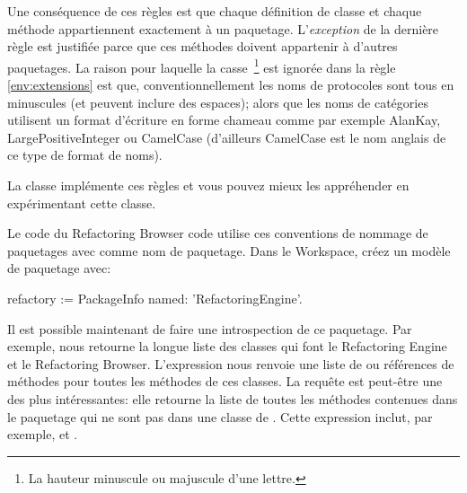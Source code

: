 \documentclass[a4paper,10pt,twoside]{book}
\begin{document}
\noindent
Une cons\'equence de ces r\`egles est que chaque d\'efinition de classe et chaque m\'ethode appartiennent exactement \`a un paquetage. 
L'\emph{exception} de la derni\`ere r\`egle est justifi\'ee parce que
ces m\'ethodes doivent appartenir \`a d'autres paquetages.
La raison pour laquelle la casse~\footnote{La hauteur minuscule ou majuscule d'une lettre.} est ignor\'ee dans la r\`egle 
\ref{env:extensions} 
est que, conventionnellement les noms de protocoles sont tous en minuscules (et peuvent inclure des espaces); alors que les noms de cat\'egories utilisent un format d'\'ecriture en forme chameau comme par exemple AlanKay, LargePositiveInteger ou CamelCase (d'ailleurs CamelCase est le nom anglais de ce type de format de noms).

La classe  impl\'emente ces r\`egles et vous pouvez mieux les appr\'ehender en exp\'erimentant cette classe.

Le code du Refactoring Browser code utilise ces conventions de nommage de
paquetages avec  comme nom de paquetage. 
Dans le Workspace, cr\'eez un mod\`ele de paquetage avec:


\begin{code}{}
refactory := PackageInfo named: 'RefactoringEngine'.
\end{code}

Il est possible maintenant de faire une introspection de ce paquetage.
Par exemple,  nous retourne la longue liste
des classes qui font le Refactoring Engine et le Refactoring Browser.  
L'expression 
nous renvoie une liste de \mbox{} ou r\'ef\'erences de m\'ethodes
pour toutes les m\'ethodes de ces classes.
La requ\^ete  est peut-\^etre une des plus
int\'eressantes: elle retourne la liste de toutes les m\'ethodes contenues
dans le paquetage  qui ne sont pas dans une classe de . 
Cette expression inclut, par exemple,  et .
\end{document}
